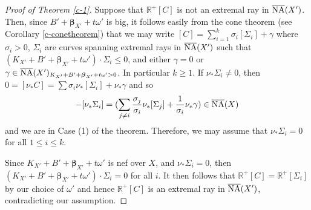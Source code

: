 \documentclass[11pt]{amsart}
\numberwithin{equation}{section}
\def\bbeta{\boldsymbol{\beta}}
\newcommand\R{{\mathbb{R}}}
\theoremstyle{definition}
\theoremstyle{definition}
\theoremstyle{definition}
\begin{document}
\begin{proof}[Proof of Theorem \ref{c-1}]
 
  Suppose that $\R^+[C]$ is not an extremal ray in $\overline {\rm NA}(X')$. Then, since $B'+\bbeta _{X'}+t\omega '$ is big, it follows easily from the cone theorem (see Corollary \ref{c-conetheorem}) that we may write $[C]=\sum_{i=1}^k \sigma _i[\Sigma _i]+\gamma$ where $\sigma _i>0$, $\Sigma _i$ are curves spanning extremal rays in $\overline {\rm NA}(X')$ such that $(K_{X'}+B'+\bbeta _{X'}+t\omega ')\cdot \Sigma _i\leq 0$, and either $\gamma =0$ or 
 $\gamma \in \overline {\rm NA}(X')_{K_{X'}+B'+\bbeta _{X'}+t\omega ' >0}$. In particular $k\geq 1$. If $\nu _*\Sigma _i\ne 0$, then $0=[\nu _*C]=\sum \sigma _i\nu _*[\Sigma _i]+\nu _*\gamma$ and so \[ -[\nu _*\Sigma _i]=(\sum _{j\ne i}\frac {\sigma _j}{\sigma _i}\nu _*[\Sigma _j]+\frac {1}{\sigma _i}\nu_*\gamma)\in \overline {\rm NA}(X)\] and we are in Case (1) of the theorem.
Therefore, we may assume that $\nu _*\Sigma _i=0$ for all $1\leq i\leq k$.

 Since $K_{X'}+B'+\bbeta _{X'}+t\omega '$ is nef over $X$, and $\nu _*\Sigma_i =0$, then $(K_{X'}+B'+\bbeta _{X'}+t\omega ')\cdot \Sigma_i =0$ for all $i$. It then follows that $\R^+[C]=\R^+[\Sigma _i]$  by our choice of $\omega '$ and hence $\R^+[C]$ is an extremal ray in $\overline {\rm NA}(X')$, contradicting our assumption.


\end{proof}
\end{document}
